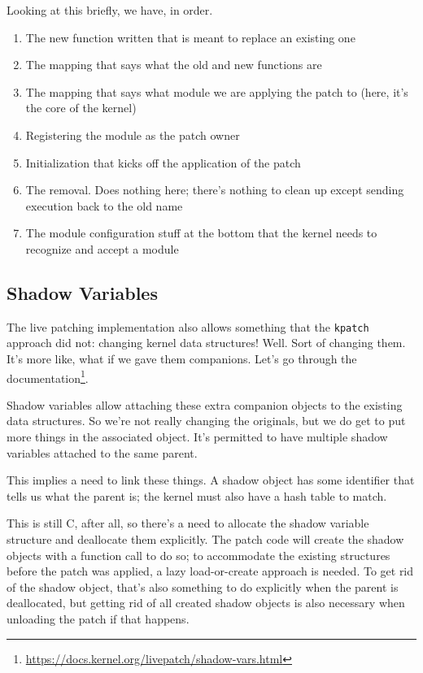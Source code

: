 Looking at this briefly, we have, in order.
\begin{enumerate}
	\item The new function written that is meant to replace an existing one
	\item The mapping that says what the old and new functions are
	\item The mapping that says what module we are applying the patch to (here, it's the core of the kernel)
	\item Registering the module as the patch owner
	\item Initialization that kicks off the application of the patch
	\item The removal. Does nothing here; there's nothing to clean up except sending execution back to the old name
	\item The module configuration stuff at the bottom that the kernel needs to recognize and accept a module
\end{enumerate}


\subsection*{Shadow Variables}
The live patching implementation also allows something that the \texttt{kpatch} approach did not: changing kernel data structures! Well. Sort of changing them. It's more like, what if we gave them companions. Let's go through the documentation\footnote{ \url{https://docs.kernel.org/livepatch/shadow-vars.html} }.

Shadow variables allow attaching these extra companion objects to the existing data structures. So we're not really changing the originals, but we do get to put more things in the associated object. It's permitted to have multiple shadow variables attached to the same parent. 

This implies a need to link these things. A shadow object has some identifier that tells us what the parent is; the kernel must also have a hash table to match.

This is still C, after all, so there's a need to allocate the shadow variable structure and deallocate them explicitly. The patch code will create the shadow objects with a function call to do so; to accommodate the existing structures before the patch was applied, a lazy load-or-create approach is needed. To get rid of the shadow object, that's also something to do explicitly when the parent is deallocated, but getting rid of all created shadow objects is also necessary when unloading the patch if that happens. 




